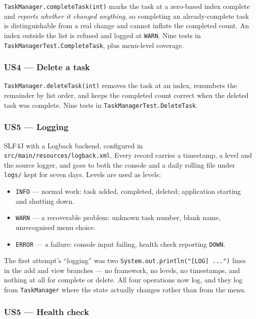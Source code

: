 \documentclass[11pt,a4paper]{article}
\newcommand{\code}[1]{\texttt{\small #1}}
\begin{document}
\code{TaskManager.completeTask(int)} marks the task at a zero-based index
complete and \emph{reports whether it changed anything}, so completing an
already-complete task is distinguishable from a real change and cannot inflate
the completed count. An index outside the list is refused and logged at
\code{WARN}. Nine tests in \code{TaskManagerTest.CompleteTask}, plus menu-level
coverage.

\subsubsection*{US4 --- Delete a task}

\code{TaskManager.deleteTask(int)} removes the task at an index, renumbers the
remainder by list order, and keeps the completed count correct when the deleted
task was complete. Nine tests in \code{TaskManagerTest.DeleteTask}.

\subsubsection*{US5 --- Logging}

SLF4J with a Logback backend, configured in
\code{src/main/resources/logback.xml}. Every record carries a timestamp, a level
and the source logger, and goes to both the console and a daily rolling file
under \code{logs/} kept for seven days. Levels are used as levels:

\begin{itemize}
  \item \code{INFO} --- normal work: task added, completed, deleted;
        application starting and shutting down.
  \item \code{WARN} --- a recoverable problem: unknown task number, blank name,
        unrecognised menu choice.
  \item \code{ERROR} --- a failure: console input failing, health check
        reporting \code{DOWN}.
\end{itemize}

The first attempt's ``logging'' was two \code{System.out.println("[LOG] ...")}
lines in the add and view branches --- no framework, no levels, no timestamps,
and nothing at all for complete or delete. All four operations now log, and they
log from \code{TaskManager} where the state actually changes rather than from
the menu.

\subsubsection*{US5 --- Health check}
\end{document}
